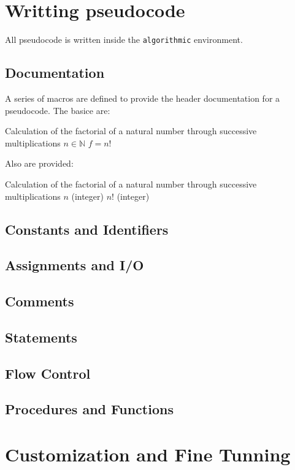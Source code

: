 \documentclass[12pt]{ltxdoc}
\begin{document}
\section{Writting pseudocode}
All pseudocode is written inside the \texttt{algorithmic} environment.

\subsection{Documentation}
A series of macros are defined to provide the header documentation for a pseudocode. The basice are:

\begin{tcblisting}{}
    \begin{algorithmic}
        \Description Calculation of the factorial of a natural number through successive multiplications
        \Require $n \in \mathbb{N}$
        \Ensure $f = n!$
    \end{algorithmic}
\end{tcblisting}

Also are provided:

\begin{tcblisting}{}
    \begin{algorithmic}
        \Description Calculation of the factorial of a natural number through successive multiplications
        \Input $n$ (integer)
        \Output $n!$ (integer)
    \end{algorithmic}
\end{tcblisting}

\subsection{Constants and Identifiers}

\subsection{Assignments and I/O}

\subsection{Comments}

\subsection{Statements}

\subsection{Flow Control}

\subsection{Procedures and Functions}


\section{Customization and Fine Tunning}
\end{document}
